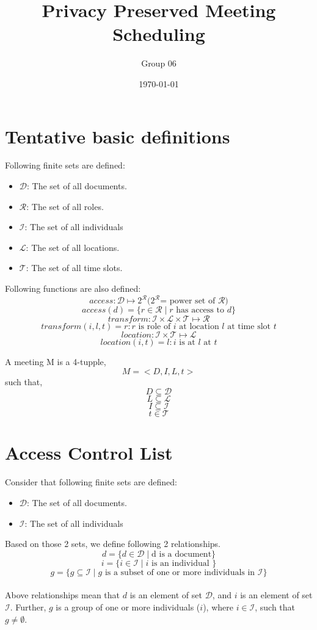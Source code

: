 \documentclass{article}
\title{Privacy Preserved Meeting Scheduling}
\author{Group 06}
\date{\today} %
\begin{document}
\maketitle

\section{Tentative basic definitions}

\noindent
Following finite sets are defined:
\begin{itemize}
    \item $\mathcal{D}$: The set of all documents.
    \item $\mathcal{R}$: The set of all roles.
    \item $\mathcal{I}$: The set of all individuals
    \item $\mathcal{L}$: The set of all locations.
    \item $\mathcal{T}$: The set of all time slots.
\end{itemize}

\noindent
Following functions are also defined:
    \[ access: \mathcal{D} \mapsto 2^\mathcal{R} \text{(} 2^\mathcal{R} \text{= power set of } \mathcal{R} \text{)} \] 
    \[ access(d) = \{ r \in \mathcal{R} \mid r \text{ has access to } d \} \] 
    \[ transform: \mathcal{I} \times \mathcal{L} \times \mathcal{T} \mapsto \mathcal{R} \] 
    \[ transform(i, l, t) = r : r \text{ is role of } i \text{ at location } l \text{ at time slot } t \] 
    \[ location: \mathcal{I} \times \mathcal{T} \mapsto \mathcal{L} \] 
    \[ location(i, t)  = l : i \text{ is at } l \text{ at } t \]

\noindent
A meeting M is a 4-tupple,
    \[ M = < D, I, L, t > \]
such that,
    \[ D \subseteq \mathcal{D} \]
    \[ L \subseteq \mathcal{L} \]
    \[ I \subseteq \mathcal{I} \]
    \[ t \in \mathcal{T} \]


\section{Access Control List}
\noindent
Consider that following finite sets are defined:
\begin{itemize}
    \item $\mathcal{D}$: The set of all documents.
    \item $\mathcal{I}$: The set of all individuals
\end{itemize}
Based on those 2 sets, we define following 2 relationships.
\[ d = \{ d \in \mathcal{D} \mid \text{d is a document} \} \]
\[ i = \{ i \in \mathcal{I} \mid i \text{ is an individual } \} \]
\[ g = \{ g \subseteq \mathcal{I} \mid g \text{ is a subset of one or more individuals in } \mathcal{I} \} \] \\ 
\noindent
Above relationships mean that $d$ is an element of set $\mathcal{D}$, and $i$ is an element of set $\mathcal{I}$. Further, $g$ is a group of one or more individuals ($i$), where $i \in \mathcal{I}$, such that $g \ne \emptyset$.\\ 
\end{document}
